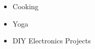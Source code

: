 %
%
%
%


\twocolumnsection
{
\begin{skills}
\end{skills}}
{
\vspace{1em}
\begin{itemize}
	\item Cooking
	\item Yoga                 
    \item DIY Electronics Projects
\end{itemize}
}
